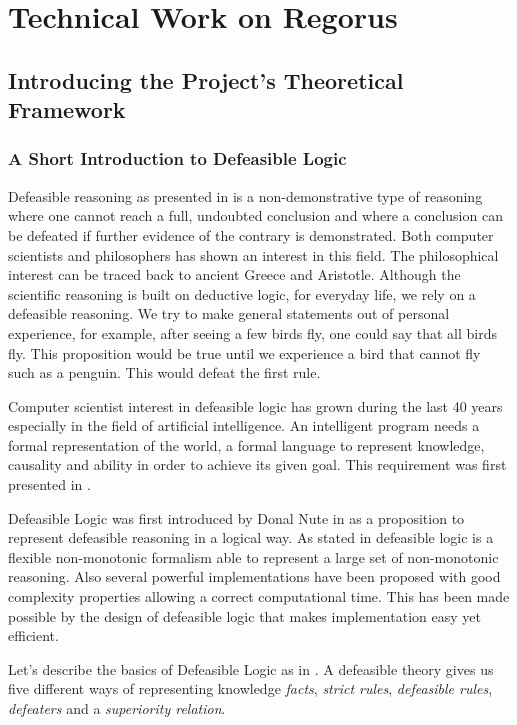 \documentclass[10pt]{report}
\begin{document}
\chapter{Technical Work on Regorus}
\section{Introducing the Project's Theoretical Framework}
\subsection{A Short Introduction to Defeasible Logic}

Defeasible reasoning as presented in \autocite{koons_defeasible_2005} is a non-demonstrative type of reasoning where one cannot reach a full, undoubted conclusion and where a conclusion can be defeated if further evidence of the contrary is demonstrated. Both computer scientists and philosophers has shown an interest in this field. The philosophical interest can be traced back to ancient Greece and Aristotle. Although the scientific reasoning is built on deductive logic, for everyday life, we rely on a defeasible reasoning. We try to make general statements out of personal experience, for example, after seeing a few birds fly, one could say that all birds fly. This proposition would be true until we experience a bird that cannot fly such as a penguin. This would defeat the first rule.

Computer scientist interest in defeasible logic has grown during the last 40 years especially in the field of artificial intelligence. An intelligent program needs a formal representation of the world, a formal language to represent knowledge, causality and ability in order to achieve its given goal. This requirement was first presented in \autocite{mccarthy1968some}.

Defeasible Logic was first introduced by Donal Nute in \autocite{nute1994defeasible} as a proposition to represent defeasible reasoning in a logical way. As stated in \autocite{ecai2000} defeasible logic is a flexible non-monotonic formalism able to represent a large set of non-monotonic reasoning. Also several powerful implementations have been proposed with good complexity properties allowing a correct computational time. This has been made possible by the design of defeasible logic that makes implementation easy yet efficient.

Let's describe the basics of Defeasible Logic as in \autocite{RepresentationResultsDefeasibleLogic}. A defeasible theory gives us five different ways of representing knowledge \textit{facts}, \textit{strict rules}, \textit{defeasible rules}, \textit{defeaters} and a \textit{superiority relation}. 
\end{document}
